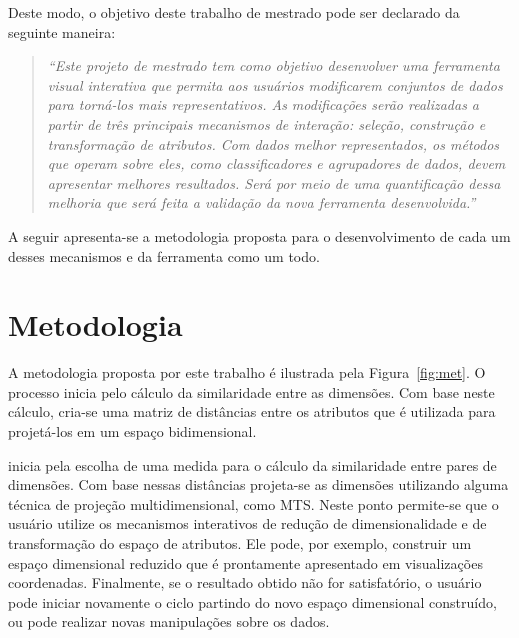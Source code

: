 
Deste modo, o objetivo deste trabalho de mestrado pode ser
declarado da seguinte maneira:

\begin{quote}
    \emph{``Este projeto de mestrado tem como objetivo
        desenvolver uma ferramenta visual interativa que
        permita aos usuários modificarem conjuntos de dados
        para torná-los mais representativos. As modificações
        serão realizadas a partir de três principais
        mecanismos de interação: seleção, construção e
        transformação de atributos. Com dados melhor
        representados, os métodos que operam sobre eles,
        como classificadores e agrupadores de dados, devem
        apresentar melhores resultados. Será por meio de uma
        quantificação dessa melhoria que será feita a
    validação da nova ferramenta desenvolvida.''}
\end{quote}

A seguir apresenta-se a metodologia proposta para o
desenvolvimento de cada um desses mecanismos e da ferramenta como um todo.

\section{Metodologia}

A metodologia proposta por este trabalho é ilustrada pela Figura~\ref{fig:met}. O processo inicia pelo cálculo da similaridade entre as dimensões. Com base neste cálculo, cria-se uma matriz de distâncias entre os atributos que é utilizada para projetá-los em um espaço bidimensional.   

inicia pela escolha de uma medida para o cálculo da similaridade entre pares de dimensões. Com base nessas distâncias projeta-se as dimensões utilizando alguma técnica de projeção multidimensional, como MTS. Neste ponto permite-se que o usuário utilize os mecanismos interativos de redução de dimensionalidade e de transformação do espaço de atributos. Ele pode, por exemplo, construir um espaço dimensional reduzido que é prontamente apresentado em visualizações coordenadas. Finalmente, se o resultado obtido não for satisfatório, o usuário pode iniciar novamente o ciclo partindo do novo espaço dimensional construído, ou pode realizar novas manipulações sobre os dados.


